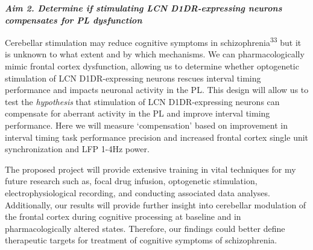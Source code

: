 \documentclass[]{article}
\begin{document}
\textbf{\emph{Aim 2. Determine if stimulating LCN D1DR-expressing
neurons compensates for PL dysfunction }}

Cerebellar stimulation may reduce cognitive symptoms in
schizophrenia\textsuperscript{33} but it is unknown to what extent and
by which mechanisms. We can pharmacologically mimic frontal cortex
dysfunction, allowing us to determine whether optogenetic stimulation of
LCN D1DR-expressing neurons rescues interval timing performance and
impacts neuronal activity in the PL. This design will allow us to test
the \emph{hypothesis} that stimulation of LCN D1DR-expressing neurons
can compensate for aberrant activity in the PL and improve interval
timing performance. Here we will measure `compensation' based on
improvement in interval timing task performance precision and increased
frontal cortex single unit synchronization and LFP 1-4Hz power.

The proposed project will provide extensive training in vital techniques
for my future research such as, focal drug infusion, optogenetic
stimulation, electrophysiological recording, and conducting associated
data analyses. Additionally, our results will provide further insight
into cerebellar modulation of the frontal cortex during cognitive
processing at baseline and in pharmacologically altered states.
Therefore, our findings could better define therapeutic targets for
treatment of cognitive symptoms of schizophrenia.
\end{document}
